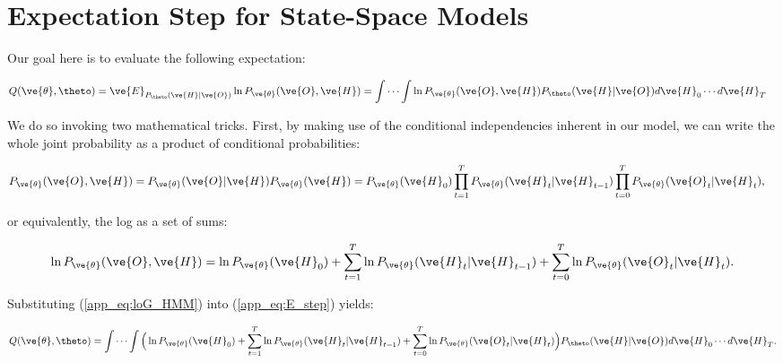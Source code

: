 \documentclass{article}
\begin{document}
\clearpage \newpage \appendix {}
\section{Expectation Step for State-Space Models} \label{sec:E}

Our goal here is to evaluate the following expectation:

\begin{align} \label{app_eq:E_step}
Q(\ve{\theta},\theto) &=
\ve{E}_{P_{\theto}(\ve{H}| \ve{O})}\ln
P_{\ve{\theta}}(\ve{O},\ve{H}) %
= \idotsint \ln P_{\ve{\theta}} (\ve{O},\ve{H}) P_{\theto} (\ve{H} |  \ve{O}) d\ve{H}_0 \cdots d\ve{H}_T
\end{align}

\noindent We do so invoking two mathematical tricks.  First, by making use of the conditional independencies inherent in our model, we can write the whole joint probability as a product of conditional probabilities:

\begin{align}
P_{\ve{\theta}} (\ve{O}, \ve{H}) &= P_{\ve{\theta}} (\ve{O} | \ve{H}) P_{\ve{\theta}} (\ve{H})%
= P_{\ve{\theta}}(\ve{H}_0) \prod_{t=1}^T P_{\ve{\theta}} (\ve{H}_t | \ve{H}_{t-1}) \prod_{t=0}^T P_{\ve{\theta}} (\ve{O}_t |  \ve{H}_t),
\end{align}

\noindent or equivalently, the log as a set of sums:

\begin{align} \label{app_eq:loG_HMM}
\ln P_{\ve{\theta}} (\ve{O}, \ve{H})
 = \ln P_{\ve{\theta}}(\ve{H}_0) + \sum_{t=1}^T \ln P_{\ve{\theta}} (\ve{H}_t | \ve{H}_{t-1}) + \sum_{t=0}^T \ln P_{\ve{\theta}} (\ve{O}_t |  \ve{H}_t).
\end{align}

\noindent Substituting (\ref{app_eq:loG_HMM}) into (\ref{app_eq:E_step}) yields:

\begin{multline} \label{app_eq:expandHHM}
Q(\ve{\theta},\theto) =
\idotsint \Big(\ln P_{\ve{\theta}}(\ve{H}_0) %
 + \sum_{t=1}^T \ln P_{\ve{\theta}} (\ve{H}_t | \ve{H}_{t-1}) %
+ \sum_{t=0}^T \ln P_{\ve{\theta}} (\ve{O}_t | \ve{H}_t)\Big) P_{\theto} (\ve{H} | \ve{O}) d\ve{H}_0 \cdots d\ve{H}_T.
\end{multline}
\end{document}
